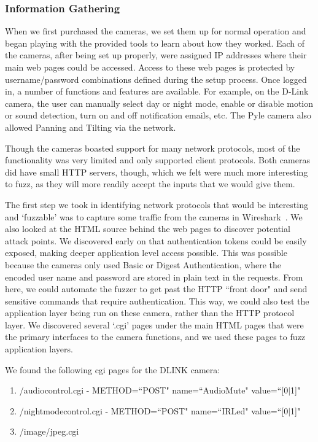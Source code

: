 \documentclass[letterpaper,twocolumn,10pt]{article}
\begin{document}
\subsubsection{Information Gathering}
When we first purchased the cameras, we set them up for normal operation and began playing with the provided tools to learn about how they worked. Each of the cameras, after being set up properly, were assigned IP addresses where their main web pages could be accessed. Access to these web pages is protected by username/password combinations defined during the setup process. Once logged in, a number of functions and features are available. For example, on the D-Link camera, the user can manually select day or night mode, enable or disable motion or sound detection, turn on and off notification emails, etc. The Pyle camera also allowed Panning and Tilting via the network.

Though the cameras boasted support for many network protocols, most of the functionality was very limited and only supported client protocols. Both cameras did have small HTTP servers, though, which we felt were much more interesting to fuzz, as they will more readily accept the inputs that we would give them. 

The first step we took in identifying network protocols that would be interesting and `fuzzable' was to capture some traffic from the cameras in Wireshark~\cite{wireshark}. We also looked at the HTML source behind the web pages to discover potential attack points. We discovered early on that authentication tokens could be easily exposed, making deeper application level access possible. This was possible because the cameras only used Basic or Digest Authentication, where the encoded user name and password are stored in plain text in the requests. From here, we could automate the fuzzer to get past the HTTP ``front door" and send sensitive commands that require authentication. This way, we could also test the application layer being run on these camera, rather than the HTTP protocol layer. We discovered several `.cgi' pages under the main HTML pages that were the primary interfaces to the camera functions, and we used these pages to fuzz application layers.

We found the following cgi pages for the DLINK camera: 


\begin{enumerate}
	\item /audiocontrol.cgi - METHOD=``POST" name=``AudioMute" value=``[0$\mid$1]"
	\item /nightmodecontrol.cgi - METHOD=``POST" name=``IRLed" value=``[0$\mid$1]"
	\item /image/jpeg.cgi
\end{enumerate}
\end{document}
